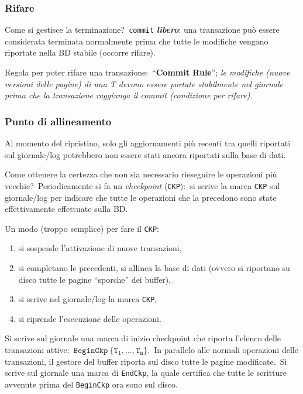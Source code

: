 \subsubsection{Rifare}

Come si gestisce la terminazione?\
\texttt{commit} \textbf{\textit{libero}}: una transazione può essere considerata terminata normalmente prima che tutte le modifiche vengano riportate nella BD stabile (occorre rifare).\

Regola per poter rifare una transazione:\ ``\textbf{Commit Rule}''; \textit{le modifiche (nuove versioni delle pagine) di una T devono essere portate stabilmente nel giornale prima che la transazione raggiunga il commit (condizione per rifare)}.

\subsubsection{Punto di allineamento}

Al momento del ripristino, solo gli aggiornamenti più recenti tra quelli riportati sul giornale{\slash}log potrebbero non essere stati ancora riportati sulla base di dati.\

Come ottenere la certezza che non sia necessario rieseguire le operazioni più vecchie?\
Periodicamente si fa un \textit{checkpoint} (\texttt{CKP}):\ si scrive la marca \texttt{CKP} sul giornale{\slash}log per indicare che tutte le operazioni che la precedono sono state effettivamente effettuate sulla BD.

\vspace{12pt}
\noindent Un modo (troppo semplice) per fare il \texttt{CKP}:
\begin{enumerate}
	\item si sospende l'attivazione di nuove transazioni,
	\item si completano le precedenti, si allinea la base di dati (ovvero si riportano su disco tutte le pagine ``sporche'' dei buffer),
	\item si scrive nel giornale/log la marca \texttt{CKP},
	\item si riprende l'esecuzione delle operazioni.
\end{enumerate}

\noindent Si scrive sul giornale una marca di inizio checkpoint che riporta l'elenco delle transazioni attive:\ $\mathtt{BeginCkp\ \{T_1,\dots,T_n\}}$.\
In parallelo alle normali operazioni delle transazioni, il gestore del buffer riporta sul disco tutte le pagine modificate.\
Si scrive sul giornale una marca di \texttt{EndCkp}, la quale certifica che tutte le scritture avvenute prima del \texttt{BeginCkp} ora sono sul disco.\

